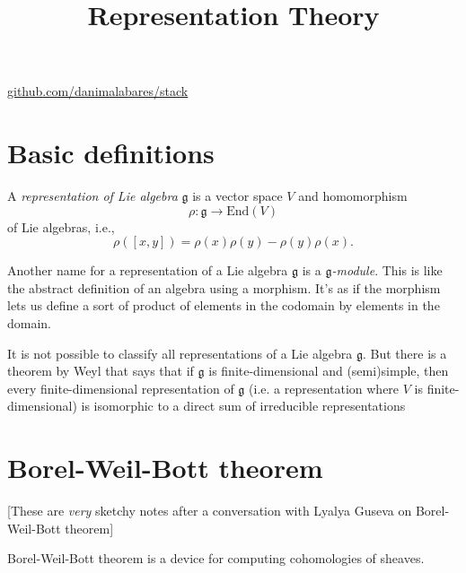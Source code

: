



\title{Representation Theory}
\maketitle

\label{section-phantom}
\hfill
\href{http://github.com/danimalabares/stack}{github.com/danimalabares/stack}

\tableofcontents

\section{Basic definitions}
\label{section-basic-definitions}

\begin{definition}
\label{definition-representation}
A {\it representation of Lie algebra} $\mathfrak{g}$ is a vector space $V$ 
and homomorphism
$$
\rho:\mathfrak{g} \to \text{End}(V)
$$
of Lie algebras, i.e.,
$$
\rho([x,y])=\rho(x)\rho(y)-\rho(y)\rho(x).
$$
\end{definition}

\begin{remark}
\label{remark-representations-are-modules}
Another name for a representation of a Lie algebra $\mathfrak{g}$ is a 
{\it $\mathfrak{g}$-module}. This is like the abstract definition of an algebra
using a morphism. It's as if the morphism lets us define a sort of product of
elements in the codomain by elements in the domain.
\end{remark}

It is not possible to classify all representations of a Lie algebra
$\mathfrak{g}$. But there is a theorem by Weyl that says that if $\mathfrak{g}$
is finite-dimensional and (semi)simple, then every finite-dimensional
representation of $\mathfrak{g}$ 
(i.e. a representation where $V$ is finite-dimensional) 
is isomorphic to a direct sum of irreducible representations 

\section{Borel-Weil-Bott theorem}
\label{section-Borel-Weil-Bott-thoerem}

[These are {\it very} sketchy notes after a conversation with Lyalya Guseva on
Borel-Weil-Bott theorem]

Borel-Weil-Bott theorem is a device for computing cohomologies of sheaves.

